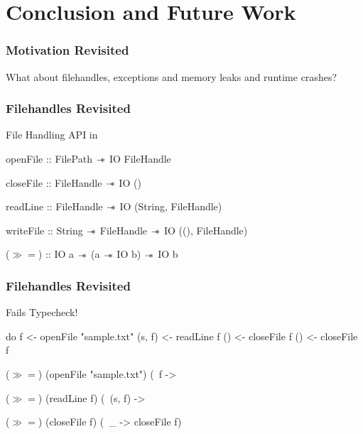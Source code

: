 \section{Conclusion and Future Work}\label{sec:conclusion}

\begin{frame}[fragile, c]
  \frametitle{Motivation Revisited}
  \begin{center}
    {\LARGE
      What about filehandles, exceptions and memory leaks and runtime crashes?
    }
\end{center}

\end{frame}

\begin{frame}[fragile, c]
  \frametitle{Filehandles Revisited}
  \begin{center}
  File Handling API in \qub{}
  \begin{haskell}
     openFile  :: FilePath   $\mathrel{-\mkern-6mu*}$ IO FileHandle

     closeFile :: FileHandle $\mathrel{-\mkern-6mu*}$ IO ()

     readLine  :: FileHandle $\mathrel{-\mkern-6mu*}$ IO (String, FileHandle)

     writeFile :: String     $\mathrel{-\mkern-6mu*}$ FileHandle
                             $\mathrel{-\mkern-6mu*}$ IO ((), FileHandle)




     ($\gg\!=$) :: IO a $\mathrel{-\mkern-6mu*}$ (a $\mathrel{-\mkern-6mu*}$ IO b) $\mathrel{-\mkern-6mu*}$ IO b
   \end{haskell}
\end{center}
\end{frame}

\begin{frame}[fragile, c]
  \frametitle{Filehandles Revisited}
  \begin{center}
  {\LARGE \color{white}Fails Typecheck!}

  \begin{haskell}
               do f  <- openFile "sample.txt"
                  (s, f)  <- readLine f
                  () <- closeFile f
                  () <- closeFile f
            \end{haskell}

            \begin{haskell}
               ($\gg\!=$) (openFile "sample.txt") (\ f ->

               ($\gg\!=$) (readLine f) (\ (s, f) ->

               ($\gg\!=$) (closeFile f) (\ _ -> closeFile f)
            \end{haskell}
          \end{center}

\end{frame}

